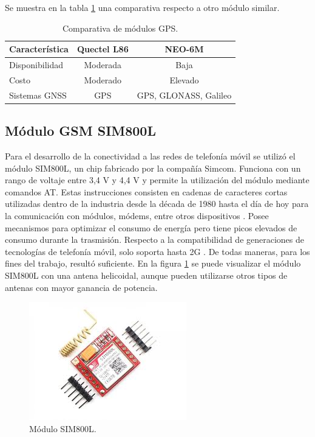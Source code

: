 Se muestra en la tabla \ref{tab:comparativa-gps} una comparativa respecto a otro módulo similar.

\begin{table}[h]
	\centering
	\caption[Comparativa de módulos GPS.]{Comparativa de módulos GPS.}
	\begin{tabular}{l c c}    
		\toprule
		\textbf{Característica} 	 & \textbf{Quectel L86} & \textbf{NEO-6M} \\
		\midrule
		Disponibilidad & Moderada & Baja			\\		
		Costo & Moderado & Elevado			\\
		Sistemas GNSS & GPS & GPS, GLONASS, Galileo		\\
		\bottomrule
		\hline
	\end{tabular}
	\label{tab:comparativa-gps}
\end{table}

\subsection{Módulo GSM SIM800L}

Para el desarrollo de la conectividad a las redes de telefonía móvil se utilizó el módulo SIM800L, un chip fabricado por la compañía Simcom. Funciona con un rango de voltaje entre 3,4 V y 4,4 V y permite la utilización del módulo mediante comandos AT. Estas instrucciones consisten en cadenas de caracteres cortas utilizadas dentro de la industria desde la década de 1980 hasta el día de hoy para la comunicación con módulos, módems, entre otros dispositivos \citep{AT:1}. Posee mecanismos para optimizar el consumo de energía pero tiene picos elevados de consumo durante la trasmisión. Respecto a la compatibilidad de generaciones de tecnologías de telefonía móvil, solo soporta hasta 2G \citep{SIM800L:1}. De todas maneras, para los fines del trabajo, resultó suficiente. En la figura \ref{fig:sim800l} se puede visualizar el módulo SIM800L con una antena helicoidal, aunque pueden utilizarse otros tipos de antenas con mayor ganancia de potencia.

\begin{figure}[H]
	\centering
	\includegraphics[width=.6\textwidth]{./Figures/sim800l.jpg}
	\caption{Módulo SIM800L.}
	\label{fig:sim800l}
\end{figure}

